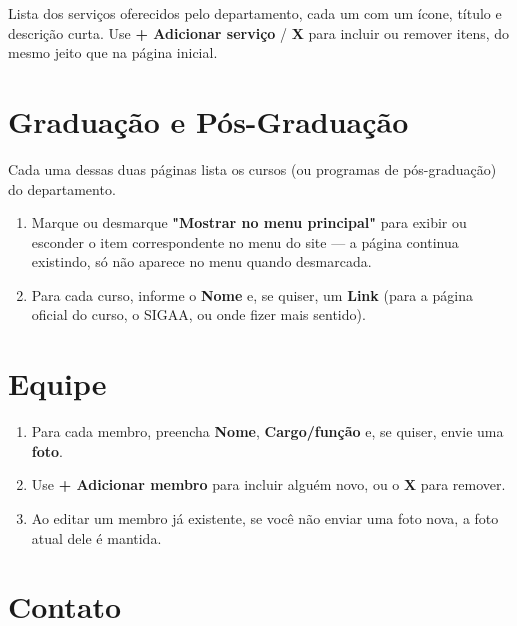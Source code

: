 \documentclass[11pt,a4paper]{article}
\begin{document}
Lista dos serviços oferecidos pelo departamento, cada um com um ícone, título e descrição curta.
Use \textbf{+ Adicionar serviço} / \textbf{X} para incluir ou remover itens, do mesmo jeito que
na página inicial.

\section{Graduação e Pós-Graduação}

Cada uma dessas duas páginas lista os cursos (ou programas de pós-graduação) do departamento.

\begin{enumerate}[leftmargin=2em]
    \item Marque ou desmarque \textbf{"Mostrar no menu principal"} para exibir ou esconder o
          item correspondente no menu do site — a página continua existindo, só não aparece no
          menu quando desmarcada.
    \item Para cada curso, informe o \textbf{Nome} e, se quiser, um \textbf{Link} (para a página
          oficial do curso, o SIGAA, ou onde fizer mais sentido).
\end{enumerate}

\section{Equipe}

\begin{enumerate}[leftmargin=2em]
    \item Para cada membro, preencha \textbf{Nome}, \textbf{Cargo/função} e, se quiser, envie
          uma \textbf{foto}.
    \item Use \textbf{+ Adicionar membro} para incluir alguém novo, ou o \textbf{X} para
          remover.
    \item Ao editar um membro já existente, se você não enviar uma foto nova, a foto atual dele
          é mantida.
\end{enumerate}

\section{Contato}
\end{document}
